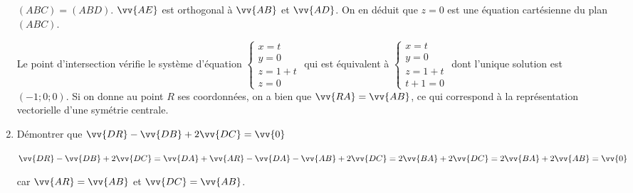 \documentclass[11pt]{article}
\begin{document}
\begin{enumerate}
    $(ABC) = (ABD)$. $\vv{AE}$ est orthogonal à $\vv{AB}$ et $\vv{AD}$.
    On en déduit que $\boxed{z=0}$ est une équation cartésienne du plan
    $(ABC)$.

    Le point d'intersection vérifie le système d'équation
    $\left\lbrace\begin{matrix}x = t\\y = 0\\ z = 1 + t \\ z  = 0
    \end{matrix}\right.$ qui est équivalent à
    $\left\lbrace\begin{matrix}x = t\\y = 0\\ z = 1 + t \\ t + 1 =
    0\end{matrix}\right.$ dont l'unique solution est $(-1;0;0)$. Si on
    donne au point $R$ ses coordonnées, on a bien que $\vv{RA} =
    \vv{AB}$, ce qui correspond à la représentation vectorielle d'une
    symétrie centrale.

  \item Démontrer que $\vv{DR} -\vv{DB} + 2\vv{DC} = \vv{0}$

    $\vv{DR} -\vv{DB} + 2\vv{DC} = \vv{DA} + \vv{AR} - \vv{DA} - \vv{AB}
    + 2 \vv{DC} = 2\vv{BA} + 2\vv{DC} = 2\vv{BA} + 2\vv{AB} = \vv{0}$

    car $\vv{AR} = \vv{AB}$ et $\vv{DC} = \vv{AB}$.
\end{enumerate}
\end{document}
